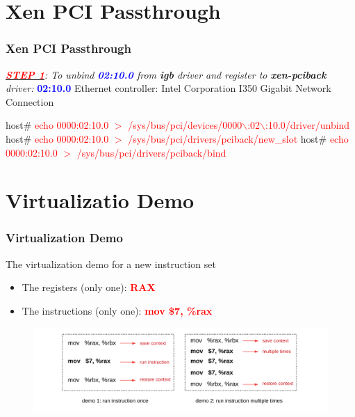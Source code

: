 \documentclass[aspectratio=169]{beamer}
\begin{document}
\section{Xen PCI Passthrough}
\begin{frame}
\frametitle{Xen PCI Passthrough}
\begin{block}{}
\textit{\underline{\textbf{\textcolor{red}{STEP 1}}}: To unbind \textbf{\textcolor{blue}{02:10.0}} from \textbf{igb} driver and register to \textbf{xen-pciback} driver:} \newline
{\small \textbf{\textcolor{blue}{02:10.0}} Ethernet controller: Intel Corporation I350 Gigabit Network Connection}

\vspace{2 mm}

host\# \textcolor{red}{echo 0000:02:10.0 $>$ /sys/bus/pci/devices/0000$\backslash$:02$\backslash$:10.0/driver/unbind} \newline
host\# \textcolor{red}{echo 0000:02:10.0 $>$ /sys/bus/pci/drivers/pciback/new\_slot} \newline
host\# \textcolor{red}{echo 0000:02:10.0 $>$ /sys/bus/pci/drivers/pciback/bind}


\end{block}
\vspace{4 mm}
\end{frame}


\section{Virtualizatio Demo}
\begin{frame}
\frametitle{Virtualization Demo}
The virtualization demo for a new instruction set
\begin{itemize}
\item The registers (only one): \textbf{\textcolor{red}{RAX}}
\item The instructions (only one): \textbf{\textcolor{red}{mov \$7, \%rax}}
\end{itemize}
\begin{figure}
\includegraphics[width=1.0\linewidth]{figures/demo.pdf}
\end{figure}
\end{frame}
\end{document}
